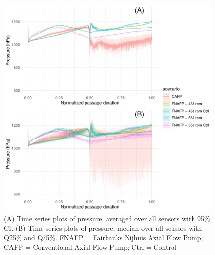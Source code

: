 \documentclass[fleqn,10pt]{wlscirep}
\begin{document}
\begin{figure}[ht]
  \centering
  \includegraphics[scale=0.7]{timeseries_all}
  \caption{(A) Time series plots of pressure, averaged over all sensors with 95\% CI. (B) Time series plots of pressure, median over all sensors with Q25\% and Q75\%. FNAFP = Fairbanks Nijhuis Axial Flow Pump; CAFP = Conventional Axial Flow Pump; Ctrl = Control}
  \label{fig:timeseries_all}
\end{figure}
\end{document}
